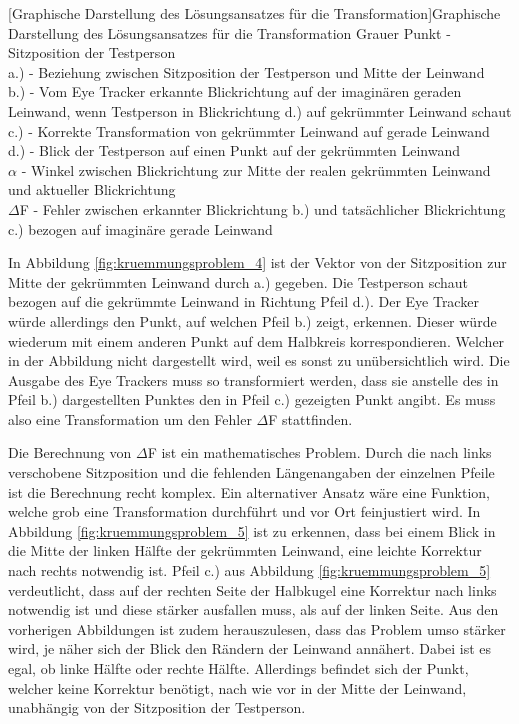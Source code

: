 \begin{center}
\begin{tikzpicture}
	\end{tikzpicture}
	[Graphische Darstellung des Lösungsansatzes für die Transformation]{Graphische Darstellung des Lösungsansatzes für die Transformation}
	\captionsetup{justification=justified, singlelinecheck=false}
	{\footnotesize Grauer Punkt - Sitzposition der Testperson\\
	a.) - Beziehung zwischen Sitzposition der Testperson und Mitte der Leinwand\\
	b.) - Vom Eye Tracker erkannte Blickrichtung auf der imaginären geraden Leinwand, wenn Testperson in Blickrichtung d.) auf gekrümmter Leinwand schaut\\
	c.) - Korrekte Transformation von gekrümmter Leinwand auf gerade Leinwand\\
	d.) - Blick der Testperson auf einen Punkt auf der gekrümmten Leinwand\\
	$\alpha$ - Winkel zwischen Blickrichtung zur Mitte der realen gekrümmten Leinwand und aktueller Blickrichtung\\
	$\Delta$F - Fehler zwischen erkannter Blickrichtung b.) und tatsächlicher Blickrichtung c.) bezogen auf imaginäre gerade Leinwand
	} \label{fig:kruemmungsproblem_4}
\end{center}


In Abbildung \ref{fig:kruemmungsproblem_4} ist der Vektor von der Sitzposition zur Mitte der gekrümmten Leinwand durch a.) gegeben. Die Testperson schaut bezogen auf die gekrümmte Leinwand in Richtung Pfeil d.). Der Eye Tracker würde allerdings den Punkt, auf welchen Pfeil b.) zeigt, erkennen. Dieser würde wiederum mit einem anderen Punkt auf dem Halbkreis korrespondieren. Welcher in der Abbildung nicht dargestellt wird, weil es sonst zu unübersichtlich wird. Die Ausgabe des Eye Trackers muss so transformiert werden, dass sie anstelle des in Pfeil b.) dargestellten Punktes den in Pfeil c.) gezeigten Punkt angibt. Es muss also eine Transformation um den Fehler $\Delta$F stattfinden.


Die Berechnung von $\Delta$F ist ein mathematisches Problem. Durch die nach links verschobene Sitzposition und die fehlenden Längenangaben der einzelnen Pfeile ist die Berechnung recht komplex. Ein alternativer Ansatz wäre eine Funktion, welche grob eine Transformation durchführt und vor Ort feinjustiert wird. In Abbildung \ref{fig:kruemmungsproblem_5} ist zu erkennen, dass bei einem Blick in die Mitte der linken Hälfte der gekrümmten Leinwand, eine leichte Korrektur nach rechts notwendig ist. Pfeil c.) aus Abbildung \ref{fig:kruemmungsproblem_5} verdeutlicht, dass auf der rechten Seite der Halbkugel eine Korrektur nach links notwendig ist und diese stärker ausfallen muss, als auf der linken Seite. Aus den vorherigen Abbildungen ist zudem herauszulesen, dass das Problem umso stärker wird, je näher sich der Blick den Rändern der Leinwand annähert. Dabei ist es egal, ob linke Hälfte oder rechte Hälfte. 
Allerdings befindet sich der Punkt, welcher keine Korrektur benötigt, nach wie vor in der Mitte der Leinwand, unabhängig von der Sitzposition der Testperson.


